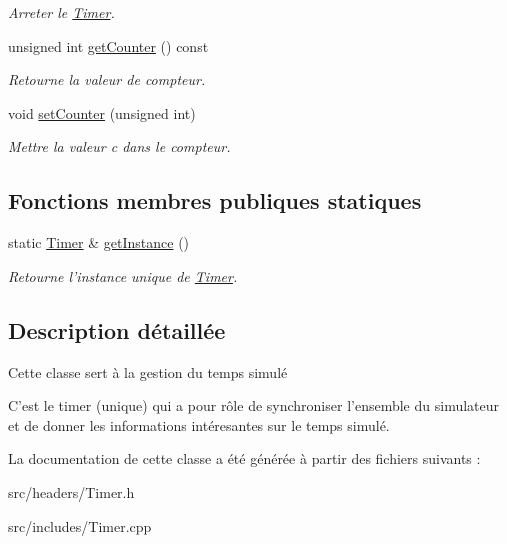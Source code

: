 \begin{DoxyCompactItemize}
\begin{DoxyCompactList}\small\item\em Arreter le \hyperlink{classTimer}{Timer}. \end{DoxyCompactList}\item 
\hypertarget{classTimer_a03ffd75bbb89ff1644839523af9fda03}{unsigned int \hyperlink{classTimer_a03ffd75bbb89ff1644839523af9fda03}{get\-Counter} () const }\label{classTimer_a03ffd75bbb89ff1644839523af9fda03}

\begin{DoxyCompactList}\small\item\em Retourne la valeur de compteur. \end{DoxyCompactList}\item 
\hypertarget{classTimer_a7394d4c4edb4d951dbe2c7e1ab2fb7ae}{void \hyperlink{classTimer_a7394d4c4edb4d951dbe2c7e1ab2fb7ae}{set\-Counter} (unsigned int)}\label{classTimer_a7394d4c4edb4d951dbe2c7e1ab2fb7ae}

\begin{DoxyCompactList}\small\item\em Mettre la valeur c dans le compteur. \end{DoxyCompactList}\end{DoxyCompactItemize}
\subsection*{Fonctions membres publiques statiques}
\begin{DoxyCompactItemize}
\item 
\hypertarget{classTimer_a8357f90f20707f9693fc713319de923a}{static \hyperlink{classTimer}{Timer} \& \hyperlink{classTimer_a8357f90f20707f9693fc713319de923a}{get\-Instance} ()}\label{classTimer_a8357f90f20707f9693fc713319de923a}

\begin{DoxyCompactList}\small\item\em Retourne l'instance unique de \hyperlink{classTimer}{Timer}. \end{DoxyCompactList}\end{DoxyCompactItemize}


\subsection{Description détaillée}
Cette classe sert à la gestion du temps simulé 

C'est le timer (unique) qui a pour rôle de synchroniser l'ensemble du simulateur et de donner les informations intéresantes sur le temps simulé. 

La documentation de cette classe a été générée à partir des fichiers suivants \-:\begin{DoxyCompactItemize}
\item 
src/headers/Timer.\-h\item 
src/includes/Timer.\-cpp\end{DoxyCompactItemize}
